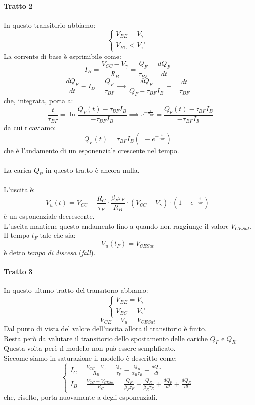 \documentclass[../main.tex]{subfiles}
\begin{document}
	\paragraph{Tratto 2}\label{par:20.3.3.2}
	In questo transitorio abbiamo:
	\[ \begin{cases} V_{BE} = V_\gamma \\ V_{BC} < V_\gamma' \end{cases} \]
	La corrente di base è esprimibile come:
	\[ I_B = \frac{V_{CC} - V_\gamma}{R_B} = \frac{Q_F}{\tau_{BF}} + \frac{dQ_F}{dt} \]
	\[ \frac{dQ_F}{dt} = I_B - \frac{Q_F}{\tau_{BF}} \implies \frac{dQ_F}{Q_F - \tau_{BF} I_B} = -\frac{dt}{\tau_{BF}} \]
	che, integrata, porta a:
	\[ -\frac{t}{\tau_{BF}} = \ln \frac{Q_F(t) - \tau_{BF} I_B}{-\tau_{BF} I_B} \implies e^{-\frac{t}{\tau_{BF}}} = \frac{Q_F(t) - \tau_{BF} I_B}{-\tau_{BF} I_B} \]
	da cui ricaviamo:
	\[ Q_F(t) = \tau_{BF} I_B \left( 1 - e^{-\frac{t}{\tau_{BF}}} \right) \]
	che è l'andamento di un esponenziale crescente nel tempo.\\\\
	La carica $Q_R$ in questo tratto è ancora nulla.\\\\
	L'uscita è:
	\[ V_u(t) = V_{CC} - \frac{R_C}{\tau_F} \cdot \frac{\beta_F \tau_F}{R_B} \cdot (V_{CC} - V_\gamma) \cdot \left( 1 - e^{-\frac{t}{\tau_{BF}}} \right) \]
	è un esponenziale decrescente.\\
	L'uscita mantiene questo andamento fino a quando non raggiunge il valore $V_{CESat}$.\\
	Il tempo $t_F$ tale che sia:
	\[ V_u(t_F) = V_{CESat} \]
	è detto \textit{tempo di discesa} (\textit{fall}).
	\paragraph{Tratto 3}
	In questo ultimo tratto del transitorio abbiamo:
	\[ \begin{cases} V_{BE} = V_\gamma \\ V_{BC} = V_\gamma' \end{cases} \]
	\[ V_{CE} = V_u = V_{CESat} \]
	Dal punto di vista del valore dell'uscita allora il transitorio è finito.\\
	Resta però da valutare il transitorio dello spostamento delle cariche $Q_F$ e $Q_R$.\\
	Questa volta però il modello non può essere semplificato.\\
	Siccome siamo in saturazione il modello è descritto come:
	\[ \begin{cases} I_C = \frac{V_{CC} - V_\gamma}{R_B} = \frac{Q_F}{\tau_F} - \frac{Q_R}{\alpha_R \tau_R} - \frac{dQ_R}{dt} \\ I_B = \frac{V_{CC} - V_{CESat}}{R_C} = \frac{Q_F}{\beta_F \tau_F} + \frac{Q_R}{\beta_R \tau_R} + \frac{dQ_F}{dt} + \frac{dQ_R}{dt} \end{cases} \]
	che, risolto, porta nuovamente a degli esponenziali.
\end{document}
